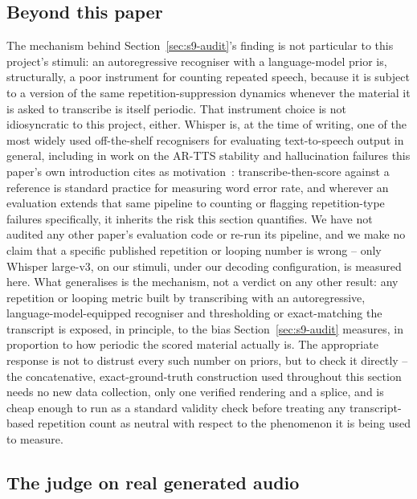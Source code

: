\documentclass[11pt]{article}
\begin{document}
\subsection{Beyond this paper}
\label{sec:s9-beyond}

The mechanism behind Section~\ref{sec:s9-audit}'s finding is not particular
to this project's stimuli: an autoregressive recogniser with a
language-model prior is, structurally, a poor instrument for counting
repeated speech, because it is subject to a version of the same
repetition-suppression dynamics whenever the material it is asked to
transcribe is itself periodic. That instrument choice is not idiosyncratic
to this project, either. Whisper is, at the time of writing, one of the most
widely used off-the-shelf recognisers for evaluating text-to-speech output
in general, including in work on the AR-TTS stability and hallucination
failures this paper's own introduction cites as
motivation~\cite{song2024ellav,xin2024ralle,du2024cosyvoice2}:
transcribe-then-score against a reference is standard practice for measuring
word error rate, and wherever an evaluation extends that same pipeline to
counting or flagging repetition-type failures specifically, it inherits the
risk this section quantifies. We have not audited any other paper's
evaluation code or re-run its pipeline, and we make no claim that a specific
published repetition or looping number is wrong -- only Whisper large-v3, on
our stimuli, under our decoding configuration, is measured here. What
generalises is the mechanism, not a verdict on any other result: any
repetition or looping metric built by transcribing with an autoregressive,
language-model-equipped recogniser and thresholding or exact-matching the
transcript is exposed, in principle, to the bias Section~\ref{sec:s9-audit}
measures, in proportion to how periodic the scored material actually is.
The appropriate response is not to distrust every such number on priors, but
to check it directly -- the concatenative, exact-ground-truth construction
used throughout this section needs no new data collection, only one
verified rendering and a splice, and is cheap enough to run as a standard
validity check before treating any transcript-based repetition count as
neutral with respect to the phenomenon it is being used to measure.


\subsection{The judge on real generated audio}
\label{sec:s9-field}
\end{document}
